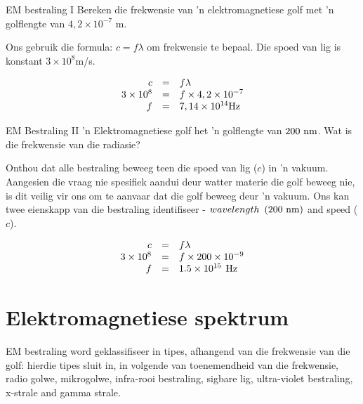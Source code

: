       \begin{wex}{EM bestraling I}{
      \label{m38777*id187899}Bereken die frekwensie van 'n elektromagnetiese golf met 'n golflengte van $4,2\ensuremath{\times}{10}^{-7}$ m.}
      { 
      \label{m38777*id187948}Ons gebruik die formula: $c=f\lambda $ om frekwensie te bepaal. Die spoed van lig is konstant $3\ensuremath{\times}{10}^{8}$m/s.\par 
    \begin{equation}
    \begin{array}{ccc}\hfill c& =& f\lambda \hfill \\ \hfill 3\ensuremath{\times}{10}^{8}& =& f\ensuremath{\times}4,2\ensuremath{\times}{10}^{-7}\hfill \\ \hfill f& =& 7,14\ensuremath{\times}{10}^{14}\text{Hz}\hfill \end{array}
      \end{equation}}    \end{wex}
 
      \begin{wex}{EM Bestraling II}{
      \label{m38777*id188123} 'n Elektromagnetiese golf het 'n golflengte van $200\phantom{\rule{3.33333pt}{0ex}}\text{nm}$. Wat is die frekwensie van die radiasie?}{
      \label{m38777*id188341} Onthou dat alle bestraling beweeg teen die spoed van lig ($c$) in 'n vakuum.
Aangesien die vraag nie spesifiek aandui deur watter materie die golf beweeg nie, is dit veilig vir ons om te aanvaar dat die golf beweeg deur 'n vakuum. 
Ons kan twee eienskapp van die bestraling identifiseer - $wavelength\phantom{\rule{3.33333pt}{0ex}}\left(200\phantom{\rule{3.33333pt}{0ex}}\text{nm}\right)$ and speed ($c$).\par 
    \begin{equation}
    \begin{array}{ccc}\hfill c& =& f\lambda \hfill \\ \hfill 3\ensuremath{\times}{10}^{8}& =& f\ensuremath{\times}200\ensuremath{\times}{10}^{-9}\hfill \\ \hfill f& =& 1.5\ensuremath{\times}{10}^{15}\phantom{\rule{4pt}{0ex}}\text{Hz}\hfill \end{array}
      \end{equation}}    \end{wex}

\section{Elektromagnetiese spektrum}
            \nopagebreak
EM bestraling word geklassifiseer in tipes, afhangend van die frekwensie van die golf: hierdie tipes sluit in, in volgende van toenemendheid van die frekwensie, radio golwe, mikrogolwe, infra-rooi bestraling, sigbare lig, ultra-violet bestraling, x-strale and gamma strale. \par 
            \nopagebreak
      

